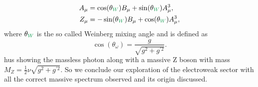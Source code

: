 %
\begin{align}
A_\mu &=\cos(\theta_{\Joaoadd{W}}) B_\mu + \sin(\theta_{\Joaoadd{W}}) A_\mu^3,  \\  
Z_\mu & =- \sin(\theta_{\Joaoadd{W}}) B_\mu + \cos(\theta_{\Joaoadd{W}}) A_\mu^3, 
\end{align}
%
where $\theta_{\Joaoadd{W}}$ is the so called Weinberg mixing angle and is defined as
%
\begin{equation}
\cos(\theta_\omega)=\frac{g}{ \sqrt{g^2 + g^{\prime 2}}}.  
\end{equation}
%
hus  showing the massless photon along with a massive Z boson with mass $M_Z= \frac{1}{2} \nu \sqrt{g^2 + g^{\prime 2}} $. 
%
So we conclude our exploration of the electroweak sector with all the correct massive spectrum observed and its origin discussed.



